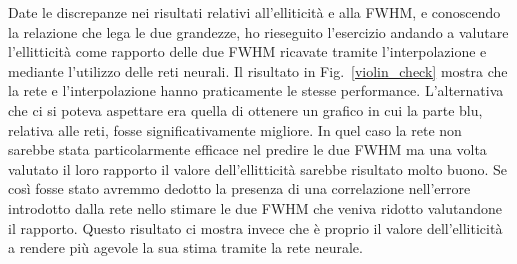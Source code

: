 \documentclass[12pt,a4paper,final]{book}
\begin{document}

Date le discrepanze nei risultati relativi all'elliticità e alla FWHM, e conoscendo la relazione che lega le due grandezze, ho rieseguito l'esercizio andando a valutare l'ellitticità come rapporto delle due FWHM ricavate tramite l'interpolazione e mediante l'utilizzo delle reti neurali. Il risultato in Fig.~\ref{violin_check} mostra che la rete e l'interpolazione hanno praticamente le stesse performance.
L'alternativa che ci si poteva aspettare era quella di ottenere un grafico in cui la parte blu, relativa alle reti, fosse significativamente migliore. In quel caso la rete non sarebbe stata particolarmente efficace nel predire le due FWHM ma una volta valutato il loro rapporto il valore dell'ellitticità sarebbe risultato molto buono. Se così fosse stato avremmo dedotto la presenza di una correlazione nell'errore introdotto dalla rete nello stimare le due FWHM che veniva ridotto valutandone il rapporto.
Questo risultato ci mostra invece che è proprio il valore dell'elliticità a rendere più agevole la sua stima tramite la rete neurale.
\end{document}
